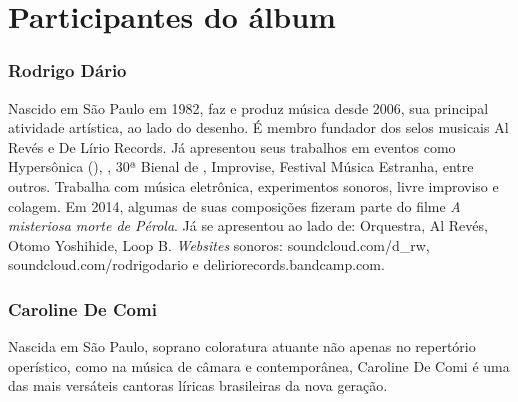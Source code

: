 \chapter{Participantes do álbum}

\subsection{Rodrigo Dário}

Nascido em São Paulo em 1982, faz e produz música desde 2006, sua
principal atividade artística, ao lado do desenho. É membro fundador dos
selos musicais Al Revés e De Lírio Records. Já apresentou seus trabalhos
em eventos como Hypersônica (), , 30ª Bienal de , Improvise,
Festival Música Estranha, entre outros. Trabalha com música eletrônica,
experimentos sonoros, livre improviso e colagem. Em 2014, algumas de
suas composições fizeram parte do filme \emph{A misteriosa morte de
Pérola}. Já se apresentou ao lado de:  Orquestra, Al Revés, Otomo
Yoshihide, Loop B. \emph{Websites} sonoros: soundcloud.com/d\_rw,
soundcloud.com/rodrigodario e deliriorecords.bandcamp.com.

\subsection{Caroline De Comi}

Nascida em São Paulo, soprano coloratura atuante não apenas no
repertório operístico, como na música de câmara e contemporânea,
Caroline De Comi é uma das mais versáteis cantoras líricas brasileiras
da nova geração.

